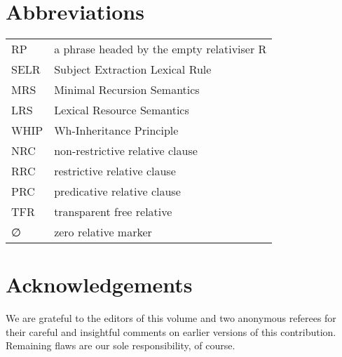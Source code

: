 \documentclass[output=paper
 	        ,biblatex
                ,babelshorthands
                ,newtxmath
                ,draftmode
                ,colorlinks, citecolor=brown
]{langscibook}
\begin{document}

\section*{Abbreviations}

\begin{tabularx}{.99\textwidth}{@{}lX}
RP & a phrase headed by the empty relativiser R\\
SELR & Subject Extraction Lexical Rule         \\            
MRS & Minimal Recursion Semantics              \\            
LRS & Lexical Resource Semantics               \\            
WHIP &  Wh-Inheritance Principle                \\             
NRC & non-restrictive relative clause           \\             
RRC & restrictive relative clause               \\             
PRC & predicative relative clause               \\             
TFR & transparent free relative                 \\             
∅   & zero relative marker
\end{tabularx}





\section*{Acknowledgements}
We are grateful to the editors of this volume and two anonymous referees for their careful
and insightful comments on earlier versions of this contribution. Remaining flaws are our
sole responsibility, of course.


{\sloppy 
\printbibliography[heading=subbibliography,notkeyword=this] 
}
\end{document}
